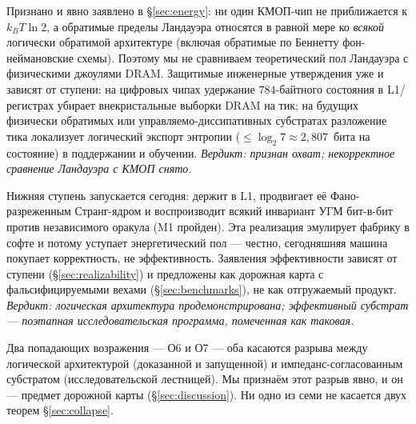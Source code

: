 \begin{redteambox}
Признано и явно заявлено в \S\ref{sec:energy}: ни один КМОП-чип не приближается
к $k_BT\ln 2$, а обратимые пределы Ландауэра относятся в равной мере ко
\emph{всякой} логически обратимой архитектуре (включая обратимые по Беннетту
фон-неймановские схемы). Поэтому мы не сравниваем теоретический пол Ландауэра с
физическими джоулями DRAM. Защитимые инженерные утверждения уже и зависят от
ступени: на цифровых чипах удержание $784$-байтного состояния в L1/регистрах
убирает внекристальные выборки DRAM на тик; на будущих физически обратимых или
управляемо-диссипативных субстратах разложение тика локализует логический
экспорт энтропии ($\le\log_2 7\approx 2{,}807$~бита на состояние) в поддержании
и обучении. \emph{Вердикт: признан охват; некорректное сравнение Ландауэра с
КМОП снято.}
\end{redteambox}

\begin{redteambox}
Нижняя ступень запускается сегодня: \SYNARC{} держит \DM{} в L1, продвигает её
Фано-разреженным Странг-ядром и воспроизводит всякий инвариант УГМ бит-в-бит
против независимого оракула (M1 пройден). Эта реализация эмулирует фабрику в
софте и потому уступает энергетический пол --- честно, сегодняшняя машина покупает
корректность, не эффективность. Заявления эффективности зависят от ступени
(\S\ref{sec:realizability}) и предложены как дорожная карта с фальсифицируемыми
вехами (\S\ref{sec:benchmarks}), не как отгружаемый продукт. \emph{Вердикт:
логическая архитектура продемонстрирована; эффективный субстрат --- поэтапная
исследовательская программа, помеченная как таковая.}
\end{redteambox}

\noindent Два попадающих возражения --- О6 и О7 --- оба касаются разрыва между
логической архитектурой (доказанной и запущенной) и импеданс-согласованным
субстратом (исследовательской лестницей). Мы признаём этот разрыв явно, и он ---
предмет дорожной карты (\S\ref{sec:discussion}). Ни одно из семи не касается двух
теорем \S\ref{sec:collapse}.
